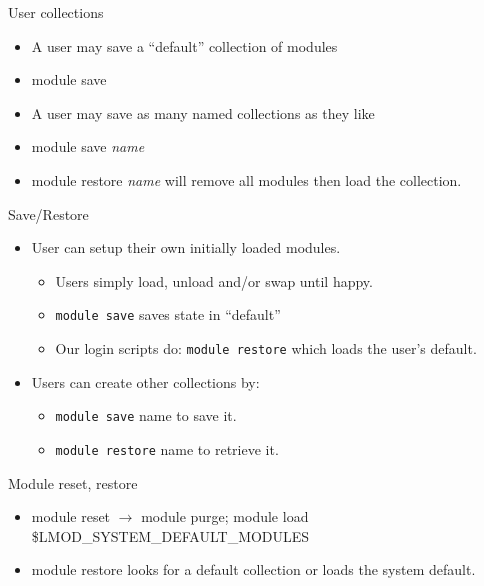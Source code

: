 \documentclass[dvipsnames,aspectratio=169]{beamer}
\begin{document}
\begin{frame}{User collections}
  \begin{itemize}
    \item A user may save a ``default'' collection of modules 
    \item module save 
    \item A user may save as many named collections as they like
    \item module save \emph{name}
    \item module restore \emph{name} will remove all modules then load
      the collection.
  \end{itemize}
\end{frame}

\begin{frame}{Save/Restore}
  \begin{itemize}
    \item User can setup their own initially loaded modules.
      \begin{itemize}
        \item Users simply load, unload and/or swap until happy.
        \item {\color{blue}\texttt{module save}} saves state in ``default''
        \item Our login scripts do: {\color{blue}\texttt{module restore}}
          which loads the user's default.
      \end{itemize}
    \item Users can create other collections by:
      \begin{itemize}
        \item {\color{blue}\texttt{module save}
            {\color{violet}name}} to save it.
        \item {\color{blue}\texttt{module restore}
            {\color{violet}name}} to retrieve it.
      \end{itemize}
  \end{itemize}
\end{frame}

\begin{frame}{Module reset, restore}
  \begin{itemize}
    \item module reset $\rightarrow$ module purge; module load
      \$LMOD\_SYSTEM\_DEFAULT\_MODULES
    \item module restore looks for a default collection or loads the
      system default.
  \end{itemize}
\end{frame}
\end{document}
